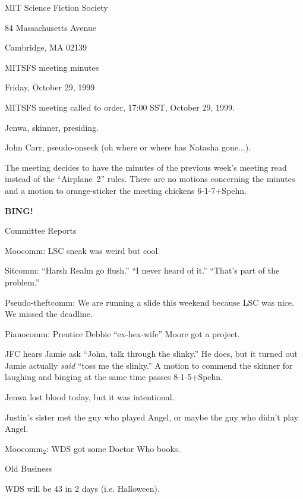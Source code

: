 \documentclass[12pt]{article}
\begin{document}
\begin{center}

MIT Science Fiction Society 

84 Massachusetts Avenue

Cambridge, MA 02139

\vspace{12pt}

MITSFS meeting minutes

Friday, October 29, 1999

\end{center}

\vskip 12pt

MITSFS meeting called to order, 17:00 SST, October 29, 1999.

Jenwa, skinner, presiding.

John Carr, pseudo-onseck (oh where or where has Natasha gone...).

The meeting decides to have the minutes of the previous week's meeting
read instead of the ``Airplane~2'' rules.  There are no motions concerning
the minutes and a motion to orange-sticker the meeting chickens \hbox{6-1-7+Spehn}.

{\bf BING!}

\vskip 12pt

\centerline{Committee Reports}

Moocomm: LSC sneak was weird but cool.

Sitcomm: ``Harsh Realm go flush.'' ``I never heard of it.'' ``That's part
of the problem.''

Pseudo-theftcomm: We are running a slide this weekend because LSC was nice.
We missed the deadline.

Pianocomm: Prentice Debbie ``ex-hex-wife'' Moore got a project.

JFC hears Jamie ask ``John, talk through the slinky.''  He does,
but it turned out Jamie actually {\it said} ``toss me the slinky.''
A motion to commend the skinner for laughing and binging at the same
time passes 8-1-5+Spehn.

Jenwa lost blood today, but it was intentional.

Justin's sister met the guy who played Angel, or maybe the guy who didn't
play Angel.

Moocomm$_2$: WDS got some Doctor Who books.

\vskip 12pt

\centerline{Old Business}

WDS will be 43 in 2 days (i.e. Halloween).
\end{document}
